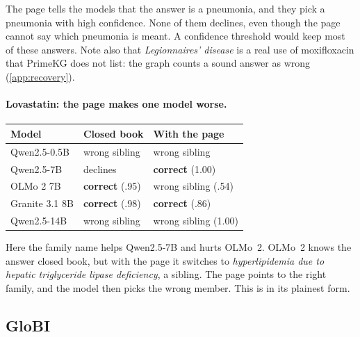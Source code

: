 The page tells the models that the answer is a pneumonia, and they pick a pneumonia with high confidence. None of them declines, even though the page cannot say which pneumonia is meant. A confidence threshold would keep most of these answers. Note also that \emph{Legionnaires' disease} is a real use of moxifloxacin that PrimeKG does not list: the graph counts a sound answer as wrong (\cref{app:recovery}).

\paragraph{Lovastatin: the page makes one model worse.}

\begin{center}
\footnotesize
\setlength{\tabcolsep}{3pt}
\begin{tabular}{@{}lll@{}}
\toprule
Model & Closed book & With the page \\
\midrule
Qwen2.5-0.5B & wrong sibling & wrong sibling \\
Qwen2.5-7B & declines & \textbf{correct} (1.00) \\
OLMo 2 7B & \textbf{correct} (.95) & wrong sibling (.54) \\
Granite 3.1 8B & \textbf{correct} (.98) & \textbf{correct} (.86) \\
Qwen2.5-14B & wrong sibling & wrong sibling (1.00) \\
\bottomrule
\end{tabular}
\end{center}

Here the family name helps Qwen2.5-7B and hurts OLMo~2. OLMo~2 knows the answer closed book, but with the page it switches to \emph{hyperlipidemia due to hepatic triglyceride lipase deficiency}, a sibling. The page points to the right family, and the model then picks the wrong member. This is \clade{} in its plainest form.

\subsection{GloBI}

